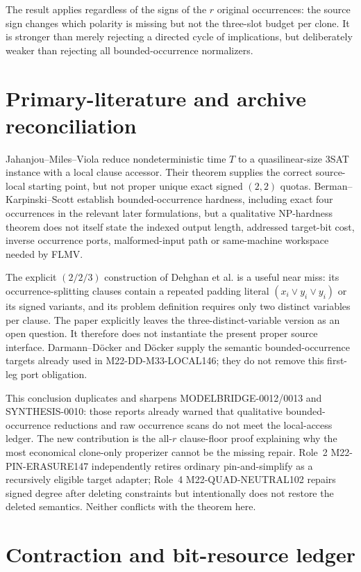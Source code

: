 \documentclass[11pt]{article}
\begin{document}
The result applies regardless of the signs of the $r$ original occurrences:
the source sign changes which polarity is missing but not the three-slot
budget per clone.  It is stronger than merely rejecting a directed cycle of
implications, but deliberately weaker than rejecting all bounded-occurrence
normalizers.

\section{Primary-literature and archive reconciliation}

Jahanjou--Miles--Viola reduce nondeterministic time $T$ to a quasilinear-size
3SAT instance with a local clause accessor.  Their theorem supplies the
correct source-local starting point, but not proper unique exact signed
$(2,2)$ quotas.  Berman--Karpinski--Scott establish bounded-occurrence
hardness, including exact four occurrences in the relevant later
formulations, but a qualitative NP-hardness theorem does not itself state the
indexed output length, addressed target-bit cost, inverse occurrence ports,
malformed-input path or same-machine workspace needed by FLMV.

The explicit $(2/2/3)$ construction of Dehghan et al. is a useful near miss:
its occurrence-splitting clauses contain a repeated padding literal
$(x_i\vee y_i\vee y_i)$ or its signed variants, and its problem definition
requires only two distinct variables per clause.  The paper explicitly leaves
the three-distinct-variable version as an open question.  It therefore does
not instantiate the present proper source interface.  Darmann--D\"ocker and
D\"ocker supply the semantic bounded-occurrence targets already used in
M22-DD-M33-LOCAL146; they do not remove this first-leg port obligation.

This conclusion duplicates and sharpens MODELBRIDGE-0012/0013 and
SYNTHESIS-0010: those reports already warned that qualitative bounded-
occurrence reductions and raw occurrence scans do not meet the local-access
ledger.  The new contribution is the all-$r$ clause-floor proof explaining
why the most economical clone-only properizer cannot be the missing repair.
Role~2 M22-PIN-ERASURE147 independently retires ordinary pin-and-simplify as
a recursively eligible target adapter; Role~4 M22-QUAD-NEUTRAL102 repairs
signed degree after deleting constraints but intentionally does not restore
the deleted semantics.  Neither conflicts with the theorem here.

\section{Contraction and bit-resource ledger}
\end{document}

